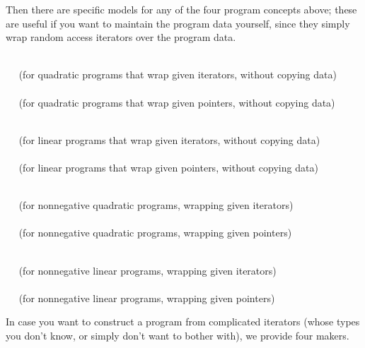 Then there are specific models for any of the four program concepts above; 
these are useful if you want to maintain the program data yourself, since
they simply wrap random access iterators over the program data. 

\\
$\quad$ (for quadratic programs that wrap given iterators, without copying 
data) \\
\\
$\quad$ (for quadratic programs that wrap given pointers, without copying 
data) 

\\
$\quad$ (for linear programs that wrap given iterators, without copying 
data) \\
\\
$\quad$ (for linear programs that wrap given pointers, without copying 
data) 

\\
$\quad$ (for nonnegative quadratic programs, wrapping given iterators)\\
\\
$\quad$ (for nonnegative quadratic programs, wrapping given pointers)

\\
$\quad$ (for nonnegative linear programs, wrapping given iterators)\\
\\
$\quad$ (for nonnegative linear programs, wrapping given pointers)


In case you want to construct a program from complicated iterators
(whose types you don't know, or simply don't want to bother with), 
we provide four makers.

\\
\\
\\

